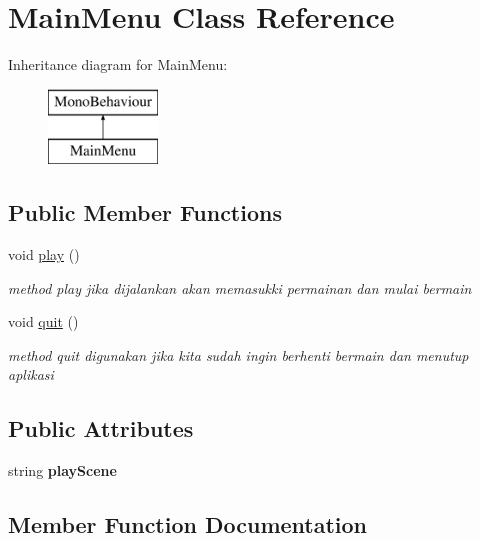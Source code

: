 \hypertarget{class_main_menu}{}\section{Main\+Menu Class Reference}
\label{class_main_menu}
Inheritance diagram for Main\+Menu\+:\begin{figure}[H]
\begin{center}
\leavevmode
\includegraphics[height=2.000000cm]{class_main_menu}
\end{center}
\end{figure}
\subsection*{Public Member Functions}
\begin{DoxyCompactItemize}
\item 
void \hyperlink{class_main_menu_a3b485623041665dfe78d13a5b79896aa}{play} ()
\begin{DoxyCompactList}\small\item\em method play jika dijalankan akan memasukki permainan dan mulai bermain \end{DoxyCompactList}\item 
void \hyperlink{class_main_menu_ad60c51b0265c457357538cb3a6880918}{quit} ()
\begin{DoxyCompactList}\small\item\em method quit digunakan jika kita sudah ingin berhenti bermain dan menutup aplikasi \end{DoxyCompactList}\end{DoxyCompactItemize}
\subsection*{Public Attributes}
\begin{DoxyCompactItemize}
\item 
\hypertarget{class_main_menu_a935dd57ea066d80c717648224bae468d}{}\label{class_main_menu_a935dd57ea066d80c717648224bae468d} 
string {\bfseries play\+Scene}
\end{DoxyCompactItemize}


\subsection{Member Function Documentation}
\hypertarget{class_main_menu_a3b485623041665dfe78d13a5b79896aa}{}\label{class_main_menu_a3b485623041665dfe78d13a5b79896aa} 
